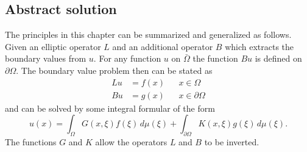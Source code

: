 \subsection{Abstract solution}
The principles in this chapter can be summarized and generalized as 
follows.
Given an elliptic operator $L$ and an additional operator $B$ which
extracts the boundary values from $u$.
For any function $u$ on $\bar\Omega$ the function $Bu$ is defined on
$\partial\Omega$.
The boundary value problem then can be stated as 
\[
\begin{aligned}
Lu&=f(x)&&x\in\Omega
\\
Bu&=g(x)&&x\in\partial\Omega
\end{aligned}
\]
and can be solved by some integral formular of the form
\[
u(x)
=
\int_\Omega G(x,\xi)f(\xi)\,d\mu(\xi)
+
\int_{\partial \Omega}K(x,\xi)g(\xi)\,d\mu(\xi).
\]
The functions $G$ and $K$ allow the operators $L$ and $B$ to be inverted.

